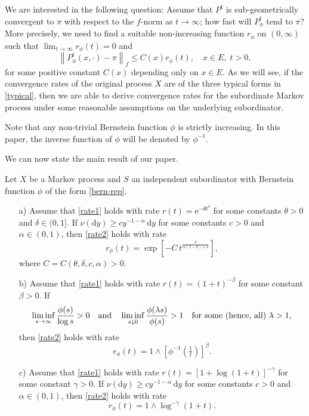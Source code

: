 \documentclass{aptpub}
\newcommand\dup{\mathrm{d}}
\newcommand\eup{\mathrm{e}}                                %
\numberwithin{equation}{section}
\begin{document}
We are interested in the following question: Assume that $P^t$ is sub-geometrically convergent to $\pi$ with respect to the $f$-norm as $t\to\infty$; how fast will $P^t_\phi$ tend to $\pi$? More precisely, we need to find a suitable non-increasing function $r_\phi$ on $(0,\infty)$ such that $\lim_{t\to\infty}r_\phi(t)=0$ and
\begin{equation}\label{rate2}
    \left\|P^t_\phi(x,\cdot)-\pi\right\|_f\leq C(x)r_\phi(t),
    \quad x\in E,\;t>0,
\end{equation}
for some positive constant $C(x)$ depending only on $x\in E$. As we will see, if the convergence rates of the original process $X$ are of the three typical forms in \eqref{typical}, then we are able to derive convergence rates for the subordinate Markov process under some reasonable assumptions on the underlying subordinator.


Note that any non-trivial Bernstein function $\phi$ is strictly increasing. In this paper, the inverse function of $\phi$ will be denoted by $\phi^{-1}$.

We can now state the main result of our paper.
\begin{thm}\label{main}
Let $X$ be a Markov process and $S$ an independent subordinator with Bernstein function $\phi$ of the form \eqref{bern-rep}.

\begin{enumerate}
\item[\upshape a)]
    Assume that \eqref{rate1} holds with rate $r(t)=\eup^{-\theta t^\delta}$ for some constants $\theta>0$ and $\delta\in(0,1]$. If $\nu(\dup y)\geq cy^{-1-\alpha}\,\dup y$ for some constants $c>0$ and $\alpha\in(0,1)$, then \eqref{rate2} holds with rate
    $$
        r_\phi(t)=\exp\left[
            -C\,t^{
            \frac{\delta}{\alpha(1-\delta)+\delta}
            }
        \right],
    $$
    where $C=C(\theta,\delta,c,\alpha)>0$.

\item[\upshape b)]
    Assume that \eqref{rate1} holds with rate $r(t)=(1+t)^{-\beta}$ for some constant $\beta>0$. If
    \begin{equation}\label{bern}
        \liminf_{s\to\infty}\frac{\phi(s)}{\log s}>0
        \quad\text{and}\quad
        \liminf_{s\downarrow0}\frac{\phi(\lambda s)}{\phi(s)}>1
        \quad\text{for some {\upshape(}hence, all{\upshape)} $\lambda>1$},
    \end{equation}
    then \eqref{rate2} holds with rate
    $$
        r_\phi(t)=1\wedge\left[
        \phi^{-1}\left(\tfrac 1t\right)
        \right]^\beta.
    $$


\item[\upshape c)]
    Assume that \eqref{rate1} holds with rate $r(t)=[1+\log(1+t)]^{-\gamma}$ for some constant $\gamma>0$. If $\nu(\dup y)\geq cy^{-1-\alpha}\,\dup y$ for some constants $c>0$ and $\alpha\in(0,1)$, then \eqref{rate2} holds with rate
    $$
        r_\phi(t)=1\wedge\log^{-\gamma}(1+t).
    $$
\end{enumerate}
\end{thm}
\end{document}
